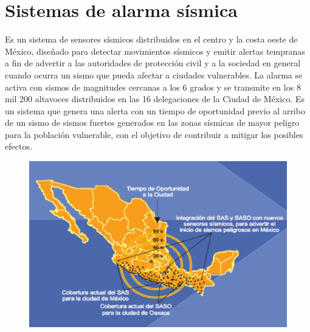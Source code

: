 \section{Sistemas de alarma sísmica}
Es un sistema de sensores sísmicos distribuidos en el centro y la costa oeste de México, diseñado para detectar movimientos sísmicos y emitir alertas tempranas a fin de advertir a las autoridades de protección civil y a la sociedad en general cuando ocurra un sismo que pueda afectar a ciudades vulnerables.
La alarma se activa con sismos de magnitudes cercanas a los 6 grados y se transmite en los 8 mil 200 altavoces distribuidos en las 16 delegaciones de la Ciudad de México. 
Es un sistema que genera una alerta con un tiempo de oportunidad previo al arribo de un sismo de sismos fuertes generados en las zonas sísmicas de mayor peligro para la población vulnerable, con el objetivo de contribuir a mitigar los posibles efectos. 
\begin{figure}[htbp]
	\begin{center}
		\includegraphics[width=.4\textwidth]{images/imgmarco/mapa2}
		\label{fig:mapa2}
	\end{center}
\end{figure}


